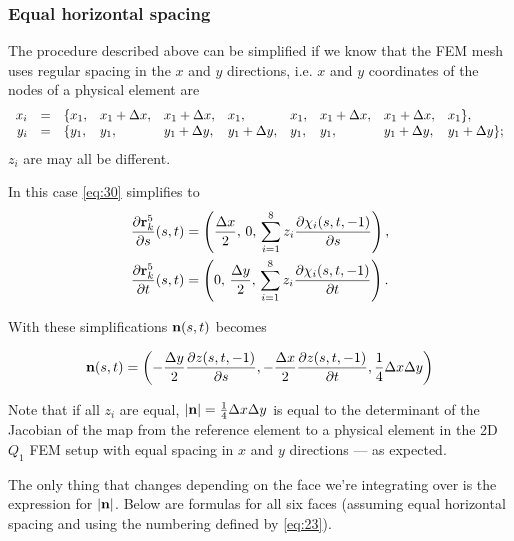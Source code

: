 \documentclass[11pt]{article}
\begin{document}
\subsubsection{Equal horizontal spacing}
\label{sec-4-1-1}

The procedure described above can be simplified if we know that the
FEM mesh uses regular spacing in the $x$ and $y$ directions, i.e.
$x$ and $y$ coordinates of the nodes of a physical element are
\begin{equation}
  \label{eq:36}
  \begin{array}{rcllllllll}
    x_{i} &=& \{ x_{1}, &x_{1} + \Delta x, &x_{1} + \Delta x, &x_{1}, &x_{1}, &x_{1} + \Delta x, &x_{1} + \Delta x, &x_{1} \},\\
    y_{i} &=& \{ y_{1}, &y_{1}, &y_{1} + \Delta y, &y_{1} + \Delta y, &y_{1}, &y_{1}, &y_{1} + \Delta y, &y_{1} + \Delta y \};\\
  \end{array}
\end{equation}
$z_{i}$ are may all be different.

In this case \eqref{eq:30} simplifies to
\begin{align}
  \label{eq:37}
  \frac{\partial \mathbf{r}_{k}^{5}}{\partial s}(s,t) &= \left(
             \frac{\Delta x}{2},\,
             0,\,
             \sum_{i=1}^{8} z_{i} \frac{\partial \chi_{i}(s, t, -1)}{\partial s} \right),\\
  \frac{\partial \mathbf{r}_{k}^{5}}{\partial t}(s,t) &= \left(
             0,\,
             \frac{\Delta y}{2},\,
             \sum_{i=1}^{8} z_{i} \frac{\partial \chi_{i}(s, t, -1)}{\partial t} \right).
\end{align}

With these simplifications $\mathbf{n}(s,t)$ becomes

\begin{equation}
  \label{eq:38}
  \mathbf{n}(s,t) = \left(
    -\frac{\Delta y}{2}\frac{\partial z(s,t,-1)}{\partial s},
    -\frac{\Delta x}{2}\frac{\partial z(s,t,-1)}{\partial t},
    \frac{1}{4} \Delta x \Delta y
  \right)
\end{equation}

Note that if all $z_{i}$ are equal, $|\mathbf{n}| = \frac{1}{4} \Delta x \Delta y$ is
equal to the determinant of the Jacobian of the map from the reference
element to a physical element in the 2D $Q_{1}$ FEM setup with equal
spacing in $x$ and $y$ directions --- as expected.

The only thing that changes depending on the face we're integrating
over is the expression for $|\mathbf{n}|$. Below are formulas for all six
faces (assuming equal horizontal spacing and using the numbering
defined by \eqref{eq:23}).
\end{document}
